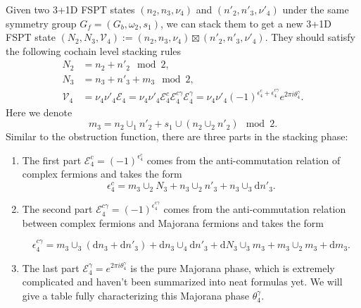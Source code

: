 \documentclass[%
 reprint,
 amsmath,amssymb,
 aps,
prb,
]{revtex4-2}
\begin{document}
Given two 3+1D FSPT states $(n_2, n_3,\nu_4)$ and $(n'_2, n'_3, \nu'_4)$ under the same symmetry group $G_f = (G_b, \omega_2, s_1)$, we can stack them to get a new 3+1D FSPT state $(N_2,N_3,\mathcal V_4) := (n_2,n_3,\nu_4) \boxtimes (n'_2,n'_3,\nu'_4)$.
They should satisfy the following cochain level stacking rules 
\begin{align}
N_2 &= n_2 + n'_2 \mod 2 ,\\
N_3 &= n_3 + n'_3 + m_3 \mod 2 ,\\
\mathcal{V}_{4} &= \nu _{4} \nu '_{4}\mathcal{E}_{4} =\nu _{4} \nu '_{4}\mathcal{E}_{4}^{c}\mathcal{E}_{4}^{c\gamma }\mathcal{E}_{4}^{\gamma } =\nu _{4} \nu '_{4}( -1)^{\epsilon _{4}^{c} +\epsilon _{4}^{c\gamma }} e^{2\pi i\theta _{4}^{\gamma }} .
\end{align}
Here we denote 
\begin{equation}
m_3 = n_2 \cup_1 n'_2 + s_1 \cup (n_2 \cup_2 n'_2) \mod 2.
\end{equation}
Similar to the obstruction function, there are three parts in the stacking phase:
\begin{enumerate}
\item The first part $\mathcal{E}_{4}^{c}=( -1)^{\epsilon _{4}^{c}}$ comes from the anti-commutation relation of complex fermions and takes the form 
\begin{equation}
\epsilon _{4}^{c}  =  m_{3} \cup _{2} N_{3} +n_{3} \cup _{2} n'_{3} +n_{3} \cup _{3}\mathrm{d} n'_{3} .
\end{equation}
\item The second part $\mathcal{E}_{4}^{c \gamma}=( -1)^{\epsilon _{4}^{c \gamma}}$ comes from the anti-commutation relation between complex fermions and Majorana fermions and takes the form 
\begin{widetext}
\begin{equation}
\epsilon _{4}^{c\gamma }  =  m_{3} \cup _{3}(\mathrm{d} n_{3} +\mathrm{d} n'_{3}) +\mathrm{d} n_{3} \cup _{4}\mathrm{d} n'_{3} +\mathrm{d} N_{3} \cup _{3} m_{3} +m_{3} \cup _{2} m_{3} +\mathrm{d} m_{3} .
\end{equation}
\end{widetext}
\item The last part $\mathcal{E}_{4}^{\gamma}=e^{2\pi i\theta _{4}^{\gamma }}$ is the pure Majorana phase, which is extremely complicated and haven't been summarized into neat formulas yet.
We will give a table fully characterizing this Majorana phase $\theta _{4}^{\gamma }$.
\end{enumerate}
\end{document}
